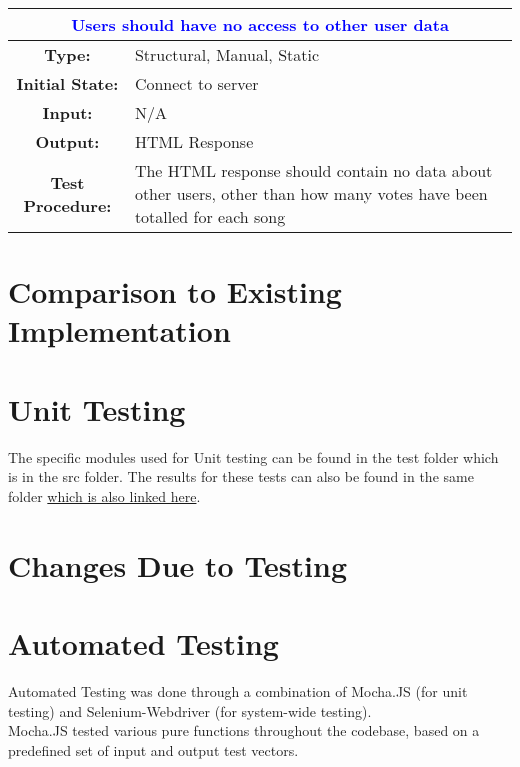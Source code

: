 \documentclass[12pt, titlepage]{article}
\begin{document}
\begin{center}
\begin{table}[H]
\begin{tabularx}{\textwidth}{| c X |}
\hline
\multicolumn{2}{|c|}{\textbf{\textcolor{blue}{Users should have no access to other user data}}}\\
\hline
\textbf{Type: } & Structural, Manual, Static\\
\textbf{Initial State: } & Connect to server\\
\textbf{Input: } & N/A\\
\textbf{Output: } & HTML Response \\
\textbf{Test Procedure:  } & The HTML response should contain no data about other users, other than how many votes have been totalled for each song \\
\hline
\end{tabularx}
\end{table}
\end{center}

\section{Comparison to Existing Implementation}	


\section{Unit Testing}
The specific modules used for Unit testing can be found in the test folder which is in the src folder. The results for these tests can also be found in the same folder \href{run:../../src/test/Test-Report-001-12-1-2016.PNG}{which is also linked here}.

\section{Changes Due to Testing}

\section{Automated Testing}

Automated Testing was done through a combination of Mocha.JS (for unit testing) and Selenium-Webdriver (for system-wide testing). \\


Mocha.JS tested various pure functions throughout the codebase, based on a predefined set of input and output test vectors. \\
\end{document}
